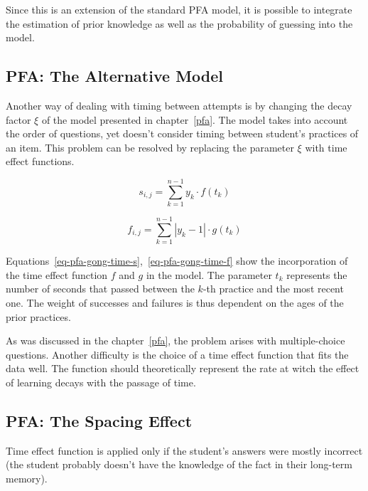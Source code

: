 Since this is an extension of the standard PFA model, it is possible to integrate the estimation of prior knowledge as well as the probability of guessing into the model.

\subsection{PFA: The Alternative Model}

Another way of dealing with timing between attempts is by changing the decay factor $\xi$ of the model presented in chapter~\ref{pfa}. The model takes into account the order of questions, yet doesn't consider timing between student's practices of an item. This problem can be resolved by replacing the parameter $\xi$ with time effect functions.

\begin{equation} \label{eq-pfa-gong-time-s}
  s_{i,j} = \sum_{k=1}^{n-1} y_k \cdot f(t_k)
\end{equation}

\begin{equation} \label{eq-pfa-gong-time-f}
  f_{i,j} = \sum_{k=1}^{n-1} |y_k - 1| \cdot g(t_k)
\end{equation}

Equations~\ref{eq-pfa-gong-time-s},~\ref{eq-pfa-gong-time-f} show the incorporation of the time effect function $f$ and $g$ in the model. The parameter $t_k$ represents the number of seconds that passed between the $k$-th practice and the most recent one. The weight of successes and failures is thus dependent on the ages of the prior practices.

As was discussed in the chapter~\ref{pfa}, the problem arises with multiple-choice questions. Another difficulty is the choice of a time effect function that fits the data well. The function should theoretically represent the rate at witch the effect of learning decays with the passage of time.

\subsection{PFA: The Spacing Effect}


Time effect function is applied only if the student's answers were mostly incorrect (the student probably doesn't have the knowledge of the fact in their long-term memory).

